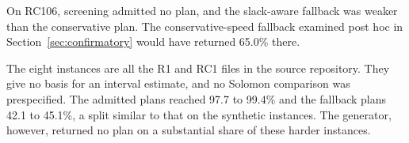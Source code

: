 On RC106, screening admitted no plan, and the slack-aware fallback was weaker than the conservative plan. The conservative-speed fallback examined post hoc in Section~\ref{sec:confirmatory} would have returned 65.0\% there.

The eight instances are all the R1 and RC1 files in the source repository. They give no basis for an interval estimate, and no Solomon comparison was prespecified. The admitted plans reached 97.7 to 99.4\% and the fallback plans 42.1 to 45.1\%, a split similar to that on the synthetic instances. The generator, however, returned no plan on a substantial share of these harder instances.
